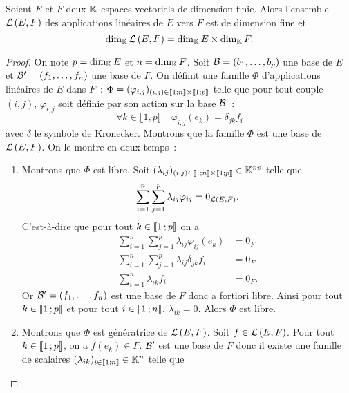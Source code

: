 \begin{theo}
  Soient \(E\) et \(F\) deux \(\mathbb{K}\)-espaces vectoriels de dimension finie. Alors l'ensemble \(\mathcal{L}\left(E,F\right)\) des applications linéaires de \(E\) vers \(F\) est de dimension fine et
  \begin{equation}
    \operatorname{dim}_{\mathbb{K}} \mathcal{L}\left(E,F\right) = \operatorname{dim}_{\mathbb{K}} E \times \operatorname{dim}_{\mathbb{K}} F.
  \end{equation}
\end{theo}
\begin{proof}
  On note \(p=\operatorname{dim}_{\mathbb{K}} E\) et \(n=\operatorname{dim}_{\mathbb{K}} F\). Soit \(\mathcal{B}=(b_1, \ldots, b_p)\) une base de \(E\) et \(\mathcal{B}'=(f_1, \ldots, f_n)\) une base de \(F\). On définit une famille \(\Phi\) d'applications linéaires de \(E\) dans \(F\)~: \(\Phi = (\varphi_{i,j})_{(i,j) \in \mathopen{\llbracket}1\mathclose{}\mathpunct{};n\mathclose{\rrbracket} \times \mathopen{\llbracket}1\mathclose{}\mathpunct{};p\mathclose{\rrbracket}}\) telle que pour tout couple \((i,j)\), \(\varphi_{i,j}\) soit définie par son action sur la base \(\mathcal{B}\)~:
  \begin{equation}
    \forall k \in \llbracket 1,p \rrbracket \quad \varphi_{i,j}(e_k)= \delta_{jk} f_i
  \end{equation}
  avec \(\delta\) le symbole de Kronecker. Montrons que la famille \(\Phi\) est une base de \(\mathcal{L}\left(E,F\right)\). On le montre en deux temps~:
  \begin{enumerate}
    \item Montrons que \(\Phi\) est libre. Soit \((\lambda_{ij})_{(i,j) \in \mathopen{\llbracket}1\mathclose{}\mathpunct{};n\mathclose{\rrbracket} \times \mathopen{\llbracket}1\mathclose{}\mathpunct{};p\mathclose{\rrbracket}} \in \mathbb{K}^{np}\) telle que
      \begin{equation}
        \sum_{i=1}^n \sum_{j=1}^p \lambda_{ij} \varphi_{ij} =0_{\mathcal{L}\left(E,F\right)}.
      \end{equation}
      C'est-à-dire que pour tout \(k \in \mathopen{\llbracket}1\mathclose{}\mathpunct{};p\mathclose{\rrbracket}\) on a
      \begin{align}
        \sum_{i=1}^n \sum_{j=1}^p \lambda_{ij} \varphi_{ij}(e_k) &=0_F\\
        \sum_{i=1}^n \sum_{j=1}^p \lambda_{ij} \delta_{jk} f_i &=0_F\\
        \sum_{i=1}^n \lambda_{ik} f_i &=0_F.
      \end{align}
      Or \(\mathcal{B}'=(f_1, \ldots, f_n)\) est une base de \(F\) donc a fortiori libre. Ainsi pour tout \(k \in \mathopen{\llbracket}1\mathclose{}\mathpunct{};p\mathclose{\rrbracket}\) et pour tout \(i \in \mathopen{\llbracket}1\mathclose{}\mathpunct{};n\mathclose{\rrbracket}\), \(\lambda_{ik}=0\). Alors \(\Phi\) est libre.
    \item  Montrons que \(\Phi\) est génératrice de \(\mathcal{L}\left(E,F\right)\). Soit \(f \in \mathcal{L}\left(E,F\right)\). Pour tout \(k \in \mathopen{\llbracket}1\mathclose{}\mathpunct{};p\mathclose{\rrbracket}\), on a \(f(e_k) \in F\). \(\mathcal{B}'\) est une base de \(F\) donc il existe une famille de scalaires \((\lambda_{ik})_{i \in  \mathopen{\llbracket}1\mathclose{}\mathpunct{};n\mathclose{\rrbracket}} \in \mathbb{K}^n\) telle que

\end{enumerate}
\end{proof}
